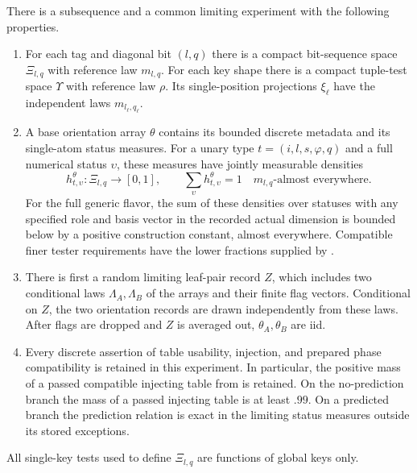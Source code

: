 \begin{lemma}
\label{lem:limit-model}
There is a subsequence and a common limiting experiment with the
following properties.
\begin{enumerate}[label=\textup{(\roman*)}]
\item For each tag and diagonal bit $(l,q)$ there is a compact
bit-sequence space $\Xi_{l,q}$ with reference law $m_{l,q}$.
For each key shape there is a compact tuple-test space $\Upsilon$
with reference law $\rho$. Its single-position projections
$\xi_\ell$ have the independent laws $m_{l_\ell,q_\ell}$.
\item A base orientation array $\theta$ contains its bounded discrete
metadata and its single-atom status measures. For a unary type
$t=(i,l,s,\varphi,q)$ and a full numerical status $\upsilon$, these measures
have jointly measurable densities
\begin{equation}
\label{eq:limit-unary-densities}
h^\theta_{t,\upsilon}:\Xi_{l,q}\longrightarrow[0,1],\qquad
\sum_\upsilon h^\theta_{t,\upsilon}=1\quad m_{l,q}\text{-almost everywhere}.
\end{equation}
For the full generic flavor, the sum of these densities over statuses
with any specified role and basis vector in the recorded actual dimension
is bounded below by a positive construction constant, almost everywhere.
Compatible finer tester
requirements have the lower fractions supplied by
.
\item There is first a random limiting leaf-pair record $Z$, which
includes two conditional laws $\Lambda_A,\Lambda_B$ of the arrays and
their finite flag vectors. Conditional on $Z$, the two orientation
records are drawn independently from these laws. After flags are
dropped and $Z$ is averaged out, $\theta_A,\theta_B$ are iid.
\item Every discrete assertion of table usability, injection, and
prepared phase compatibility is retained in this experiment. In
particular, the positive mass of a passed compatible injecting table
from  is retained. On the no-prediction
branch the mass of a passed injecting table is at least $.99$.
On a predicted branch the prediction relation is exact in the limiting
status measures outside its stored exceptions.
\end{enumerate}
All single-key tests used to define $\Xi_{l,q}$ are functions of global
keys only.
\end{lemma}

